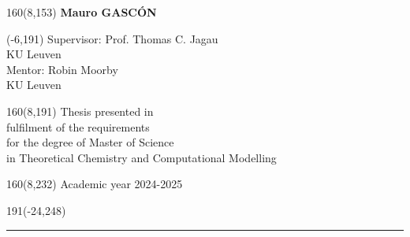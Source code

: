 \documentclass[12pt,a4paper,oneside]{book}
\begin{document}
%
\begin{textblock}{160}(8,153)
\textblockcolour{}
\vspace{-\parskip}
\flushright
\fontsize{14}{16}\selectfont \textbf{Mauro GASC{\'O}N}
\end{textblock}
%
\begin{textblock}{70}(-6,191)
\textblockcolour{}
\vspace{-\parskip}
\flushleft
Supervisor: Prof. Thomas C. Jagau\\[-2pt]
\textcolor{blueaff}{KU Leuven}\\[5pt]
Mentor: Robin Moorby\\[-2pt]
\textcolor{blueaff}{KU Leuven}\\
\end{textblock}
%
\begin{textblock}{160}(8,191)
\textblockcolour{}
\vspace{-\parskip}
\flushright
Thesis presented in\\[4.5pt]
fulfilment of the requirements\\[4.5pt]
for the degree of Master of Science\\[4.5pt]
in Theoretical Chemistry and Computational Modelling\\
\end{textblock}
%
\begin{textblock}{160}(8,232)
\textblockcolour{}
\vspace{-\parskip}
\flushright
Academic year 2024-2025
\end{textblock}
%
\begin{textblock}{191}(-24,248)
{\color{blueline}\rule{550pt}{5.5pt}}
\end{textblock}
%

\setcounter{page}{0}
\onehalfspacing


\rmfamily




\sffamily
\tableofcontents
\rmfamily

\newpage
\setcounter{page}{0}
\end{document}
